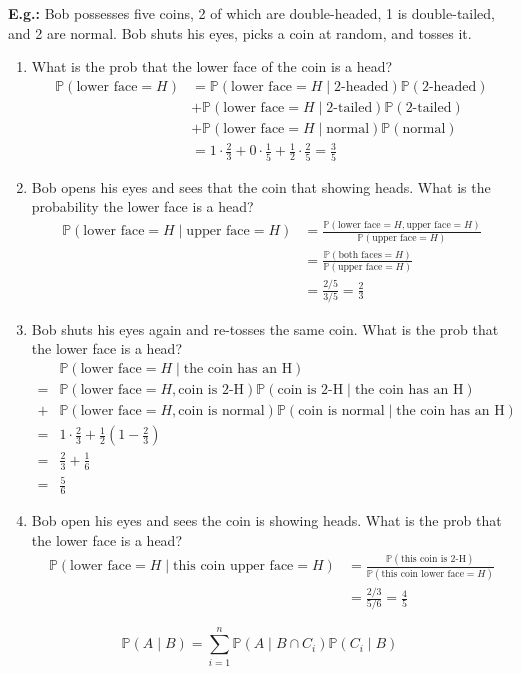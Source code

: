 \documentclass[a4paper]{article}
\newcommand{\n}{\hfill\break}
\newcommand{\eg}[1]{\par\noindent\settowidth{\hangindent}{\textbf{E.g.: }}\textbf{E.g.: }#1\n}
\newcommand{\Prob}{\mathbb{P}}
\renewcommand{\P}{\Prob}
\begin{document}
\eg{
Bob possesses five coins, 2 of which are double-headed, 1 is double-tailed, and 2 are normal. Bob shuts his eyes, picks a coin at random, and tosses it.
\begin{enumerate}
    \item What is the prob that the lower face of the coin is a head? 
    \begin{align*}
        \P(\text{lower face}=H) &= \P(\text{lower face}=H\mid\text{2-headed})\P(\text{2-headed}) \\
        &+ \P(\text{lower face} = H\mid\text{2-tailed})\P(\text{2-tailed}) \\
        &+ \P(\text{lower face} = H\mid\text{normal})\P(\text{normal}) \\
        &= 1\cdot\frac{2}{3}+0\cdot\frac{1}{5}+\frac{1}{2}\cdot\frac{2}{5} = \frac{3}{5}
    \end{align*}
    
    \item Bob opens his eyes and sees that the coin that showing heads. What is the probability the lower face is a head? 
    \begin{align*}
        \P(\text{lower face}=H\mid\text{upper face}=H) &= \frac{\P(\text{lower face}=H, \text{upper face}=H)}{\P(\text{upper face}=H)} \\
        &= \frac{\P(\text{both faces}=H)}{\P(\text{upper face}=H)} \\
        &= \frac{2/5}{3/5}=\frac{2}{3}
    \end{align*}
    
    \item Bob shuts his eyes again and re-tosses the same coin. What is the prob that the lower face is a head?
    \begin{align*}
        &\P(\text{lower face}=H\mid\text{the coin has an H}) \\ 
        =&\P(\text{lower face}=H, \text{coin is 2-H})\P(\text{coin is 2-H}\mid\text{the coin has an H}) \\
        +&\P(\text{lower face}=H, \text{coin is normal})\P(\text{coin is normal}\mid\text{the coin has an H}) \\
        =&1\cdot\frac{2}{3}+\frac{1}{2}(1-\frac{2}{3}) \\
        =&\frac{2}{3} + \frac{1}{6} \\
        =&\frac{5}{6}
    \end{align*}
    
    \item Bob open his eyes and sees the coin is showing heads. What is the prob that the lower face is a head?
    \begin{align*}
        \P(\text{lower face}=H\mid\text{this coin upper face}=H)&=\frac{\P(\text{this coin is 2-H})}{\P(\text{this coin lower face}=H)} \\
        &=\frac{2/3}{5/6}=\frac{4}{5}
    \end{align*}
\end{enumerate}
}

\[\P(A\mid B)=\sum^n_{i=1}\P(A\mid B\cap C_i)\P(C_i\mid B)\]
\end{document}
